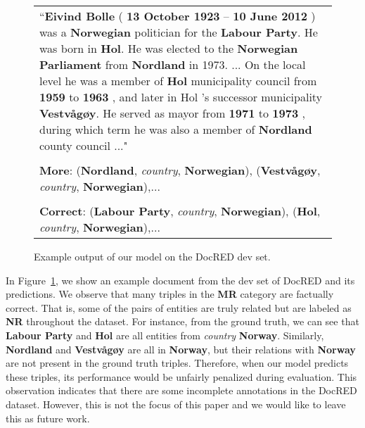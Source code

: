 \documentclass[11pt]{article}
\begin{document}
\begin{figure}[ht]
\centering
\small
\begin{tabular}{p{}}

``\textbf{Eivind Bolle} ( \textbf{13 October 1923} – \textbf{10 June 2012} ) was a \textbf{Norwegian} politician for the \textbf{Labour Party}. He was born in \textbf{Hol}. He was elected to the \textbf{Norwegian Parliament} from \textbf{Nordland} in 1973. ...  On the local level he was a member of \textbf{Hol} municipality council from \textbf{1959} to \textbf{1963} , and later in Hol 's successor municipality \textbf{Vestvågøy}. He served as mayor from \textbf{1971} to \textbf{1973} , during which term he was also a member of \textbf{Nordland} county council ..."~ ~ ~~  \\ \\
\textbf{More}: (\textbf{Nordland}, \textit{country}, \textbf{Norwegian}), (\textbf{Vestvågøy}, \textit{country}, \textbf{Norwegian}),...\\ \\
\textbf{Correct}: (\textbf{Labour Party}, \textit{country}, \textbf{Norwegian}), (\textbf{Hol}, \textit{country}, \textbf{Norwegian}),...\\

\end{tabular}
\setlength{\abovecaptionskip}{1pt}

\caption{Example output of our model on the DocRED dev set.}
\label{fig:example-output}
\end{figure}

In Figure~\ref{fig:example-output}, we show an example document from the dev set of DocRED and its predictions. We observe that many triples in the \textbf{MR} category are factually correct. That is, some of the pairs of entities are truly related but are labeled as \textbf{NR} throughout the dataset. For instance, from the ground truth, we can see that \textbf{Labour Party} and \textbf{Hol} are all entities from \textit{country} \textbf{Norway}. Similarly, \textbf{Nordland} and \textbf{Vestvågøy} are all in \textbf{Norway}, but their relations with \textbf{Norway} are not present in the ground truth triples. Therefore, when our model predicts these triples, its performance would be unfairly penalized during evaluation. This observation indicates that there are some incomplete annotations in the DocRED dataset. However, this is not the focus of this paper and we would like to leave this as future work.
\end{document}
